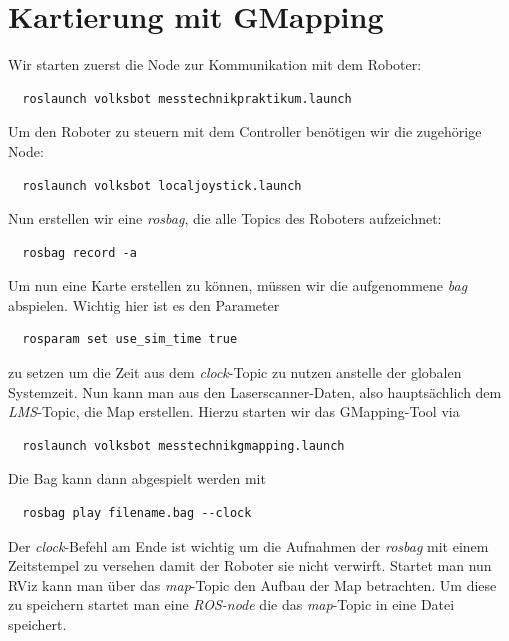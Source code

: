 \documentclass[11pt,a4paper]{article}
\begin{document}
\newpage

\section{Kartierung mit GMapping}
Wir starten zuerst die Node zur Kommunikation mit dem Roboter: \begin{verbatim}
  roslaunch volksbot messtechnikpraktikum.launch
\end{verbatim}
Um den Roboter zu steuern mit dem Controller benötigen wir die zugehörige Node: \begin{verbatim}
  roslaunch volksbot localjoystick.launch
\end{verbatim}
Nun erstellen wir eine \textit{rosbag}, die alle Topics des Roboters aufzeichnet: \begin{verbatim}
  rosbag record -a
\end{verbatim}
Um nun eine Karte erstellen zu können, müssen wir die aufgenommene \textit{bag} abspielen. 
Wichtig hier ist es den Parameter \begin{verbatim}
  rosparam set use_sim_time true
\end{verbatim} zu setzen um die Zeit aus dem \textit{clock}-Topic zu nutzen anstelle der globalen Systemzeit.
Nun kann man aus den Laserscanner-Daten, also hauptsächlich dem \textit{LMS}-Topic, die Map
erstellen. Hierzu starten wir das GMapping-Tool via \begin{verbatim}
  roslaunch volksbot messtechnikgmapping.launch
\end{verbatim}
Die Bag kann dann abgespielt werden mit \begin{verbatim}
  rosbag play filename.bag --clock
\end{verbatim}
Der \textit{clock}-Befehl am Ende ist wichtig um die Aufnahmen der \textit{rosbag} mit einem 
Zeitstempel zu versehen damit der Roboter sie nicht verwirft. 
Startet man nun RViz kann man über das \textit{map}-Topic den Aufbau der Map betrachten.
Um diese zu speichern startet man eine \textit{ROS-node} die das \textit{map}-Topic in
eine Datei speichert. 
\end{document}

